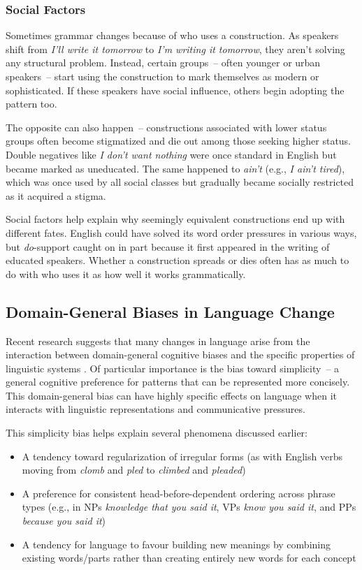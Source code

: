 \subsubsection{Social Factors}
Sometimes grammar changes because of who uses a construction. As speakers shift from \textit{I'll write it tomorrow} to \textit{I'm writing it tomorrow}, they aren't solving any structural problem. Instead, certain groups~-- often younger or urban speakers~-- start using the construction to mark themselves as modern or sophisticated. If these speakers have social influence, others begin adopting the pattern too.

The opposite can also happen~-- constructions associated with lower status groups often become stigmatized and die out among those seeking higher status. Double negatives like \textit{I don't want nothing} were once standard in English but became marked as uneducated. The same happened to \textit{ain't} (e.g., \textit{I ain't tired}), which was once used by all social classes but gradually became socially restricted as it acquired a stigma.

Social factors help explain why seemingly equivalent constructions end up with different fates. English could have solved its word order pressures in various ways, but \textit{do}-support caught on in part because it first appeared in the writing of educated speakers. Whether a construction spreads or dies often has as much to do with who uses it as how well it works grammatically.

\subsection{Domain-General Biases in Language Change}

Recent research suggests that many changes in language arise from the interaction between domain-general cognitive biases and the specific properties of linguistic systems \citep{culbertson2016simplicity}. Of particular importance is the bias toward simplicity~-- a general cognitive preference for patterns that can be represented more concisely. This domain-general bias can have highly specific effects on language when it interacts with linguistic representations and communicative pressures.

This simplicity bias helps explain several phenomena discussed earlier:
\begin{itemize}[noitemsep]
    \item A tendency toward regularization of irregular forms (as with English verbs moving from \textit{clomb} and \textit{pled} to \textit{climbed} and \textit{pleaded})
    \item A preference for consistent head-before-dependent ordering across phrase types (e.g., in NPs \textit{knowledge {\ob}that you said it{\cb}}, VPs \textit{know {\ob}you said it{\cb}}, and PPs \textit{because {\ob}you said it{\cb}})
    \item A tendency for language to favour building new meanings by combining existing words/parts rather than creating entirely new words for each concept
\end{itemize}

